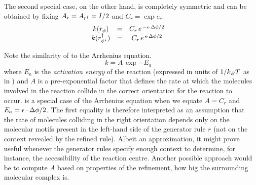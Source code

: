 The second special case,
on the other hand,
is completely symmetric
and can be obtained by fixing $A_r = A_{r^\dagger} = I/2$
and $C_r = \exp{c_r}$:
\begin{equation}
  \label{eq:sym-lkm}
  \begin{array}{ccc}
    k(r_\phi) &=& C_r\,e^{\,-\epsilon \cdot \Delta\phi/2} \\
    k(r^\dagger_{\phi^\star}) &=& C_r\,e^{\,\epsilon \cdot \Delta\phi/2}
  \end{array}
\end{equation}


Note the similarity of  to the Arrhenius equation.
\begin{equation*}
  k = A \, \exp{-E_a}
\end{equation*}
where $E_a$ is the \emph{activation energy} of the reaction
(expressed in units of $1/k_B T$ as in )
and $A$ is a pre-exponential factor that defines the rate
at which the molecules involved in the reaction
collide in the correct orientation for the reaction to occur.
 is a special case of the Arrhenius equation
when we equate $A = C_r$ and $E_a = \epsilon \cdot \Delta\phi/2$.
The first equality is therefore interpreted as an assumption
that the rate of molecules colliding
in the right orientation depends only on
the molecular motifs present in the left-hand side of
the generator rule $r$
(\ie not on the context revealed by the refined rule).
Albeit an approximation,
it might prove useful whenever the generator rules
specify enough context to determine, for instance,
the accessibility of the reaction centre.
Another possible approach would be to compute $A$
based on properties of the refinement,
\eg how big the surrounding molecular complex is.

